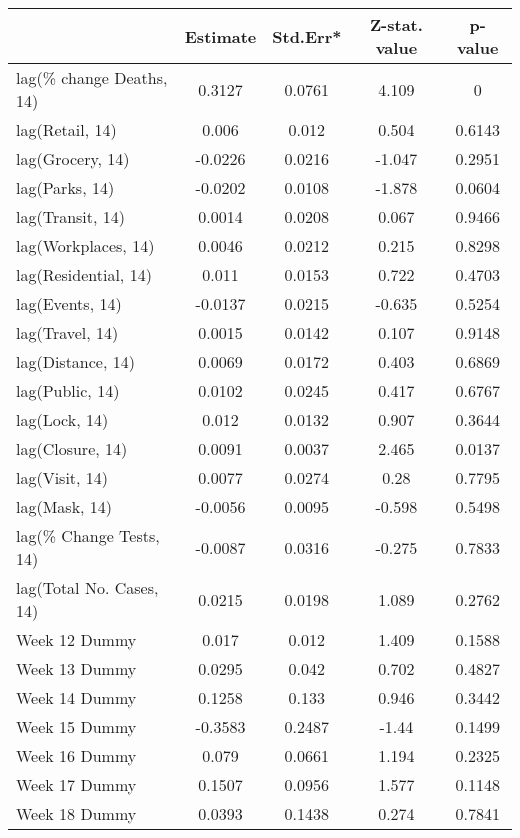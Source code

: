\begingroup\tiny
\begin{longtable}{lcccc}
  \toprule
 & Estimate & Std.Err* & Z-stat. value & p-value \\ 
  \midrule
lag(\% change Deaths, 14) & 0.3127 & 0.0761 & 4.109 & 0 \\ 
  lag(Retail, 14) & 0.006 & 0.012 & 0.504 & 0.6143 \\ 
  lag(Grocery, 14) & -0.0226 & 0.0216 & -1.047 & 0.2951 \\ 
  lag(Parks, 14) & -0.0202 & 0.0108 & -1.878 & 0.0604 \\ 
  lag(Transit, 14) & 0.0014 & 0.0208 & 0.067 & 0.9466 \\ 
  lag(Workplaces, 14) & 0.0046 & 0.0212 & 0.215 & 0.8298 \\ 
  lag(Residential, 14) & 0.011 & 0.0153 & 0.722 & 0.4703 \\ 
  lag(Events, 14) & -0.0137 & 0.0215 & -0.635 & 0.5254 \\ 
  lag(Travel, 14) & 0.0015 & 0.0142 & 0.107 & 0.9148 \\ 
  lag(Distance, 14) & 0.0069 & 0.0172 & 0.403 & 0.6869 \\ 
  lag(Public, 14) & 0.0102 & 0.0245 & 0.417 & 0.6767 \\ 
  lag(Lock, 14) & 0.012 & 0.0132 & 0.907 & 0.3644 \\ 
  lag(Closure, 14) & 0.0091 & 0.0037 & 2.465 & 0.0137 \\ 
  lag(Visit, 14) & 0.0077 & 0.0274 & 0.28 & 0.7795 \\ 
  lag(Mask, 14) & -0.0056 & 0.0095 & -0.598 & 0.5498 \\ 
  lag(\% Change Tests, 14) & -0.0087 & 0.0316 & -0.275 & 0.7833 \\ 
  lag(Total No. Cases, 14) & 0.0215 & 0.0198 & 1.089 & 0.2762 \\ 
  Week 12 Dummy & 0.017 & 0.012 & 1.409 & 0.1588 \\ 
  Week 13 Dummy & 0.0295 & 0.042 & 0.702 & 0.4827 \\ 
  Week 14 Dummy & 0.1258 & 0.133 & 0.946 & 0.3442 \\ 
  Week 15 Dummy & -0.3583 & 0.2487 & -1.44 & 0.1499 \\ 
  Week 16 Dummy & 0.079 & 0.0661 & 1.194 & 0.2325 \\ 
  Week 17 Dummy & 0.1507 & 0.0956 & 1.577 & 0.1148 \\ 
  Week 18 Dummy & 0.0393 & 0.1438 & 0.274 & 0.7841 \\ 

\end{longtable}
